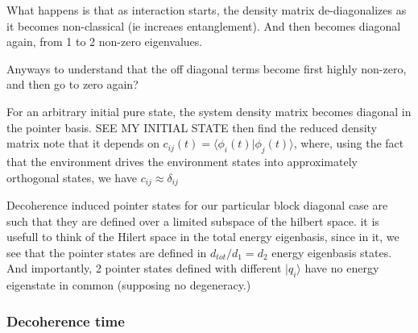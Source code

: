 \documentclass{article}
\begin{document}
What happens is that as interaction starts, the density matrix de-diagonalizes as it becomes non-classical (ie increaes entanglement). And then becomes diagonal again, from 1 to 2 non-zero eigenvalues. 

Anyways to understand that the off diagonal terms become first highly non-zero, and then go to zero again?


For an arbitrary initial pure state, the system density matrix becomes diagonal in the pointer basis.
SEE MY INITIAL STATE
then find the reduced density matrix
note that it depends on $c_{ij}(t)=\langle \phi_i(t)|\phi_j(t) \rangle$, where, using the fact that the environment drives the environment states into approximately orthogonal states, we have $c_{ij}\approx \delta_{ij}$


Decoherence induced pointer states for our particular block diagonal case are such that they are defined over a limited subspace of the hilbert space. it is usefull to think of the Hilert space in the total energy eigenbasis, since in it, we see that the pointer states are defined in $d_{tot}/d_1=d_2$ energy eigenbasis states. And importantly, 2 pointer states defined with different $|q_i\rangle$ have no energy eigenstate in common (supposing no degeneracy.)

\subsubsection{Decoherence time}
\end{document}
